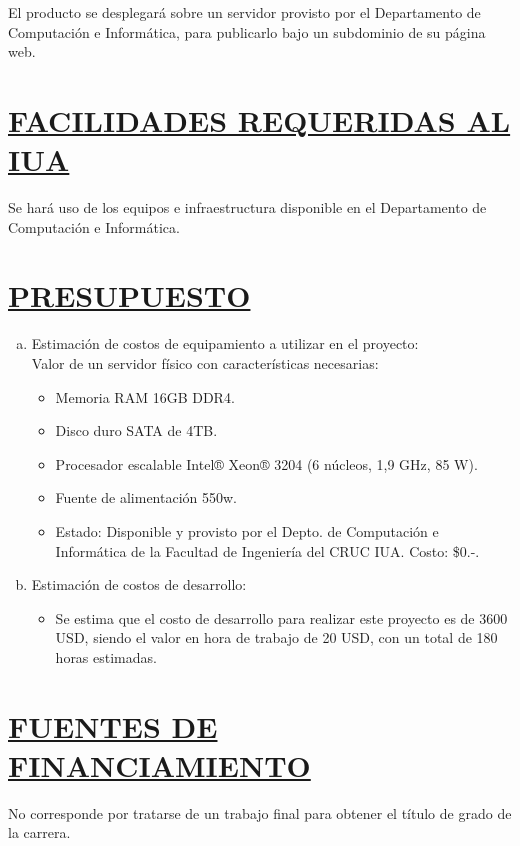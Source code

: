 El producto se desplegará sobre un servidor provisto por el Departamento de Computación e Informática, para publicarlo bajo un subdominio de su página web.\\

\section*{\underline{FACILIDADES REQUERIDAS AL IUA}}
Se hará uso de los equipos e infraestructura disponible en el Departamento de Computación e Informática.\\


\section*{\underline{PRESUPUESTO}}
\begin{enumerate}[(a)]
	\item Estimación de costos de equipamiento a utilizar en el proyecto:\\
Valor de un servidor físico con características necesarias:

		\begin{itemize}
			\item Memoria RAM 16GB DDR4.
			\item Disco duro SATA de 4TB.
			\item Procesador escalable Intel® Xeon® 3204 (6 núcleos, 1,9 GHz, 85 W).
			\item Fuente de alimentación 550w.
			\item Estado: Disponible y provisto por el Depto. de Computación e Informática de la Facultad de Ingeniería del CRUC IUA. Costo: \$0.-.
		\end{itemize}

	\item Estimación de costos de desarrollo:
		\begin{itemize}
			\item Se estima que el costo de desarrollo para realizar este proyecto es de 3600 USD, siendo el valor en hora de trabajo de 20 USD, con un total de 180 horas estimadas.\\
		\end{itemize}
\end{enumerate}

\section*{\underline{FUENTES DE FINANCIAMIENTO}}
No corresponde por tratarse de un trabajo final para obtener el título de grado de la carrera.\\


